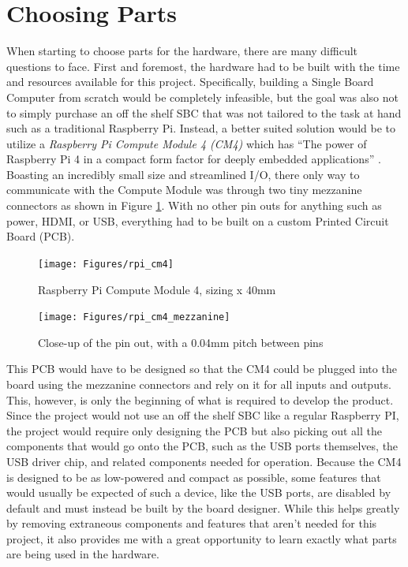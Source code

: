 \section{Choosing Parts}\label{sec:ChoosingParts}

When starting to choose parts for the hardware, there are many difficult questions to face.
First and foremost, the hardware had to be built with the time and resources available for this project.
Specifically, building a Single Board Computer from scratch would be completely infeasible, but the goal was also not to simply purchase an off the shelf SBC that was not tailored to the task at hand such as a traditional Raspberry Pi.
Instead, a better suited solution would be to utilize a \emph{Raspberry Pi Compute Module 4 (CM4)} which has \enquote{The power of Raspberry Pi 4 in a compact form factor for deeply embedded applications} \cite{rpi_cm4}.
Boasting an incredibly small size and streamlined I/O, there only way to communicate with the Compute Module was through two tiny mezzanine connectors as shown in Figure \ref{fig:rpi_cm4_mezzanine}.
With no other pin outs for anything such as power, HDMI, or USB, everything had to be built on a custom Printed Circuit Board (PCB).

\begin{figure}[h]
  \centering
  \begin{minipage}{0.45\textwidth}
    \centering
    \texttt{[image: Figures/rpi\_cm4]}
    \captionsetup{width=.75\linewidth}
    \caption[Raspberry Pi Compute Module 4]{Raspberry Pi Compute Module 4, sizing x 40mm}
    \label{fig:rpi_cm4}
  \end{minipage}\hfill
  \begin{minipage}{0.45\textwidth}
    \centering
    \texttt{[image: Figures/rpi\_cm4\_mezzanine]}
    \captionsetup{width=.75\linewidth}
    \caption[Raspberry Pi Compute Module 4 Pin out]{Close-up of the pin out, with a 0.04mm pitch between pins}
    \label{fig:rpi_cm4_mezzanine}
  \end{minipage}
\end{figure}

This PCB would have to be designed so that the CM4 could be plugged into the board using the mezzanine connectors and rely on it for all inputs and outputs.
This, however, is only the beginning of what is required to develop the product.
Since the project would not use an off the shelf SBC like a regular Raspberry PI, the project would require only designing the PCB but also picking out all the components that would go onto the PCB, such as the USB ports themselves, the USB driver chip, and related components needed for operation.
Because the CM4 is designed to be as low-powered and compact as possible, some features that would usually be expected of such a device, like the USB ports, are disabled by default and must instead be built by the board designer.
While this helps greatly by removing extraneous components and features that aren't needed for this project, it also provides me with a great opportunity to learn exactly what parts are being used in the hardware.

